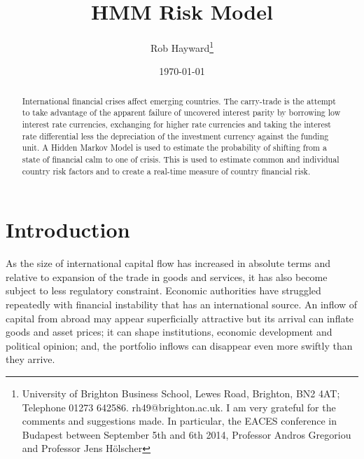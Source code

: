 \documentclass[12pt, a4paper, oneside]{article}\usepackage[]{graphicx}\usepackage[]{color}
\begin{document}
\title{HMM Risk Model}
\author{Rob Hayward\footnote{University of Brighton Business School, Lewes Road, Brighton, BN2 4AT; Telephone 01273 642586.  rh49@brighton.ac.uk.  I am very grateful for the comments and suggestions made.  In particular, the EACES conference in Budapest between September 5th and 6th 2014, Professor Andros Gregoriou and Professor Jens H\"{o}lscher}} 
\date{\today}
\maketitle
\begin{abstract}
International financial crises affect emerging countries.  The carry-trade is the attempt to take advantage of the apparent failure of uncovered interest parity by borrowing low interest rate currencies, exchanging for higher rate currencies and taking the interest rate differential less the depreciation of the investment currency against the funding unit.  A Hidden Markov Model is used to estimate the probability of shifting from a state of financial calm to one of crisis.  This is used to estimate common and individual country risk factors and to create a real-time measure of country financial risk.
\end{abstract}

\section{Introduction}
As the size of international capital flow has increased in absolute terms and relative to expansion of the trade in goods and services, it has also become subject to less regulatory constraint. Economic authorities have struggled repeatedly with financial instability that has an international source.  An inflow of capital from abroad may appear superficially attractive but its arrival can inflate goods and asset prices; it can shape institutions, economic development and political opinion; and, the portfolio inflows can disappear even more swiftly than they arrive.  %
\end{document}
